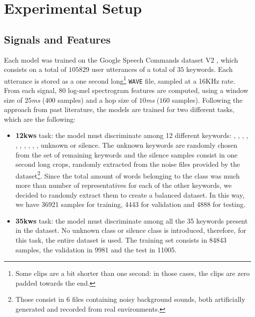 \section{Experimental Setup}

\subsection{Signals and Features}
\label{sec:sig&features}


Each model was trained on the Google Speech Commands dataset V2 \cite{speechdataset2018warden}, which consists on a total of $105829$ user utterances of a total of $35$ keywords. Each utterance is stored as a one second long\footnote{Some clips are a bit shorter than one second: in those cases, the clips are zero padded towards the end.} \verb|WAVE| file, sampled at a 16KHz rate. From each signal, $80$ log-mel spectrogram features are computed, %
using a window size of $25$\textit{ms} ($400$ samples) and a hop size of $10$\textit{ms} ($160$ samples). Following the approach from past literature, the models are trained for two different tasks, which are the following:
\begin{itemize}
	\item \textbf{12kws} task: the model must discriminate among 12 different keywords: , , , , , , , , , , unknown or silence. The unknown keywords are randomly chosen from the set of remaining keywords and the silence samples consist in one second long crops, randomly extracted from the noise files provided by the dataset\footnote{Those consist in 6 files containing noisy background sounds, both artificially generated and recorded from real environments.}. Since the total amount of words belonging to the  class was much more than number of representatives for each of the other keywords, we decided to randomly extract them to create a balanced dataset. In this way, we have 36921 samples for training, 4443 for validation and 4888 for testing.
	\item \textbf{35kws} task: the model must discriminate among all the 35 keywords present in the dataset. No unknown class or silence class is introduced, therefore, for this task, the entire dataset is used. The training set consists in 84843 samples, the validation in 9981 and the test in 11005. 
\end{itemize}

